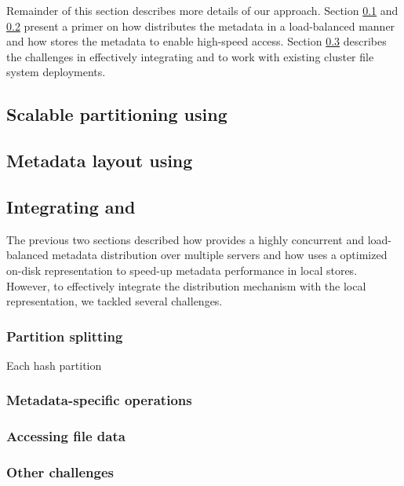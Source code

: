 Remainder of this section describes more details of our approach. 
Section \ref{design.giga} and \ref{design.tablefs} present a primer on how
\giga{} distributes the metadata in a load-balanced manner and how \tfs{}
stores the metadata to enable high-speed access. 
Section \ref{design.integration} describes the challenges in effectively
integrating \giga{} and \tfs{} to work with existing cluster file system
deployments. 

\subsection{Scalable partitioning using \giga{}}
\label{design.giga}


\subsection{Metadata layout using \tfs{}}
\label{design.tablefs}


\subsection{Integrating \giga{} and \tfs{}}
\label{design.integration}

The previous two sections described how \giga{} provides a highly concurrent and 
load-balanced metadata distribution over multiple servers and how \tfs{} uses
a optimized on-disk representation to speed-up metadata performance in local
stores. However, to effectively integrate the distribution mechanism with the
local representation, we tackled several challenges. 

\subsubsection*{Partition splitting}

Each \giga{} hash partition 

\subsubsection*{Metadata-specific operations}

\subsubsection*{Accessing file data}

\subsubsection*{Other challenges}

